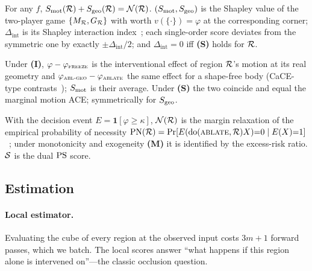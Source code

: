\begin{proposition}
\label{prop:interact}
For any $f$, $S_{\mathrm{mot}}(\mathcal{R})+S_{\mathrm{geo}}(\mathcal{R})=\mathcal{N}(\mathcal{R})$. $(S_{\mathrm{mot}},S_{\mathrm{geo}})$ is the Shapley value of the two-player game $\{M_{\mathcal{R}},G_{\mathcal{R}}\}$ with worth $v(\{\cdot\})=\varphi$ at the corresponding corner; $\Delta_{\mathrm{int}}$ is its Shapley interaction index~\cite{grabisch1999interaction}; each single-order score deviates from the symmetric one by exactly $\pm\Delta_{\mathrm{int}}/2$; and $\Delta_{\mathrm{int}}{=}0$ iff \textbf{(S)} holds for $\mathcal{R}$.
\end{proposition}

\begin{proposition}
\label{prop:ace}
Under \textbf{(I)}, $\varphi-\varphi_{\textsc{freeze}}$ is the interventional effect of region $\mathcal{R}$'s motion at its real geometry and $\varphi_{\textsc{abl-geo}}-\varphi_{\textsc{ablate}}$ the same effect for a shape-free body (CaCE-type contrasts~\cite{goyal2019cace}); $S_{\mathrm{mot}}$ is their average. Under \textbf{(S)} the two coincide and equal the marginal motion ACE; symmetrically for $S_{\mathrm{geo}}$.
\end{proposition}

\begin{proposition}
\label{prop:pnps}
With the decision event $E{=}\mathbf 1[\varphi{\ge}\kappa]$, $\mathcal{N}(\mathcal{R})$ is the margin relaxation of the empirical probability of necessity $\mathrm{PN}(\mathcal{R})=\Pr[E(\mathrm{do}(\textsc{ablate},\mathcal{R})X){=}0\mid E(X){=}1]$~\cite{pearl2009causality,watson2021lens}; under monotonicity and exogeneity \textbf{(M)} it is identified by the excess-risk ratio. $\mathcal{S}$ is the dual $\mathrm{PS}$ score.
\end{proposition}


\subsection{Estimation}
\label{sec:method-eff}
\paragraph{Local estimator.} Evaluating the cube of every region at the observed input costs $3m{+}1$ forward passes, which we batch. The local scores answer ``what happens if this region alone is intervened on''---the classic occlusion question.

